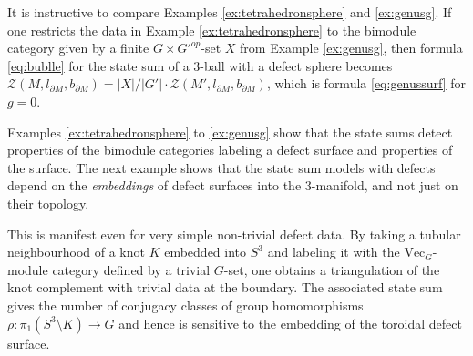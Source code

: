 \documentclass[1.5pt, a4paper]{article}
\begin{document}
It is instructive to compare  Examples  \ref{ex:tetrahedronsphere} and  \ref{ex:genusg}.  If one  restricts the data in Example \ref{ex:tetrahedronsphere} to the bimodule category given by a finite $G\times G'^{op}$-set $X$ from Example \ref{ex:genusg}, then formula \eqref{eq:bublle} for the state sum of a 3-ball with a defect sphere becomes
$
\mathcal Z(M, l_{\partial M},b_{\partial M})= |X|/ |G'|  \cdot \mathcal Z(M', l_{\partial M}, b_{\partial M})$,
which is formula \eqref{eq:genussurf} for $g=0$. 

 
 
 
 Examples \ref{ex:tetrahedronsphere} to \ref{ex:genusg} show that the state sums detect properties of the bimodule categories labeling a defect surface and properties of the surface. The next example shows that the state sum models with defects  depend on the \emph{embeddings} of defect surfaces  into the  3-manifold, and not just on their topology.  

This is manifest even for very simple non-trivial defect data. 
 By taking a tubular neighbourhood of a knot $K$ embedded into $S^3$ and labeling it with the $\mathrm{Vec}_G$-module category defined by a trivial $G$-set, one obtains a triangulation of the knot complement with trivial data at the boundary. The associated state sum gives the number of conjugacy classes of group homomorphisms $\rho:\pi_1(S^3\setminus K)\to G$ and hence is  sensitive to the embedding of the toroidal defect surface.
\end{document}
